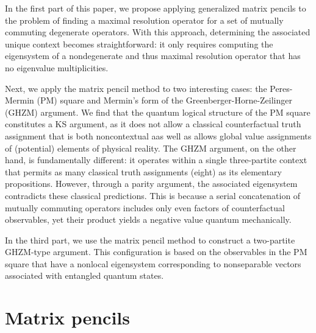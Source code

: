\documentclass[
  twocolumn,
 showpacs,
 showkeys,
 preprintnumbers,
 amsmath,amssymb,
 aps,
 pra,
  longbibliography,
 floatfix,
 ]{revtex4-2}
\begin{document}


In the first part of this paper, we propose applying generalized matrix pencils to the problem of finding a maximal resolution operator for a set of mutually commuting degenerate operators. With this approach, determining the associated unique context becomes straightforward: it only requires computing the eigensystem of a nondegenerate and thus maximal resolution operator that has no eigenvalue multiplicities.


Next, we apply the matrix pencil method to two interesting cases: the Peres-Mermin (PM) square and Mermin's form of the Greenberger-Horne-Zeilinger (GHZM) argument. We find that the quantum logical structure of the PM square constitutes a KS argument, as it does not allow a classical counterfactual truth assignment that is both noncontextual aas well as allows global value assignments of (potential) elements of physical reality. The GHZM argument, on the other hand, is fundamentally different: it operates within a single three-partite context that permits as many classical truth assignments (eight) as its elementary propositions. However, through a parity argument, the associated eigensystem contradicts these classical predictions. This is because a serial concatenation of mutually commuting operators includes only even factors of counterfactual observables, yet their product yields a negative value quantum mechanically.

In the third part, we use the matrix pencil method to construct a two-partite GHZM-type argument. This configuration is based on the observables in the PM square that have a nonlocal eigensystem corresponding to nonseparable vectors associated with entangled quantum states.


\section{Matrix pencils}
\end{document}
